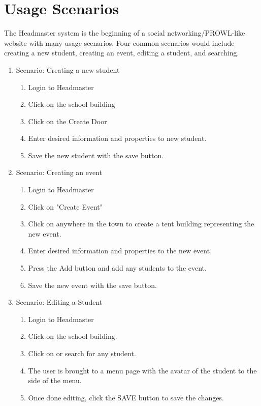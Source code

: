 \documentclass[11pt]{article}
\begin{document}
\section{Usage Scenarios}
The Headmaster system is the beginning of a social networking/PROWL-like website with many usage scenarios. Four common scenarios would include creating a new student, creating an event, editing a student, and searching.
\begin{enumerate}
    \item Scenario: Creating a new student
  \begin{enumerate}
        \item Login to Headmaster
        \item Click on the school building
        \item Click on the Create Door
        \item Enter desired information and properties to new student.
        \item Save the new student with the save button.
  \end{enumerate}
    \item Scenario: Creating an event
  \begin{enumerate}
        \item Login to Headmaster
        \item Click on "Create Event"
        \item Click on anywhere in the town to create a tent building representing the new event.
        \item Enter desired information and properties to the new event.
        \item Press the Add button and add any students to the event.
        \item Save the new event with the save button.
  \end{enumerate}
    \item Scenario: Editing a Student
  \begin{enumerate}
        \item Login to Headmaster
        \item Click on the school building.
        \item Click on or search for any student.
        \item The user is brought to a menu page with the avatar of the student to the side of the menu.
        \item Once done editing, click the SAVE button to save the changes.
  \end{enumerate}

\end{enumerate}
\end{document}
